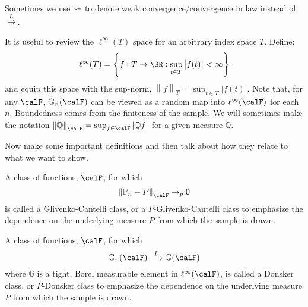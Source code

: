\begin{remark}[Notation]
	Sometimes we use \(\rightsquigarrow\) to denote weak convergence/convergence in law instead of  \(\overset{L}{\to}\).	
\end{remark}

\begin{remark}
    \label{rem:def-recall}
	It is useful to review the \(\ell^\infty(T)\) space for an arbitrary index space  \(T\). Define:
	\begin{equation}
		\label{eq:ell-infty}
		\ell^\infty(T) = \left\{f:T\to\SR: \sup_{t\in T}\left|f(t)\right| <\infty\right\}
	\end{equation}
	and equip this space with the sup-norm, \(\left\|f\right\|_T = \sup_{t\in T}\left|f(t)\right|\). Note that, for any \(\calF\),  \(\mathbb{G}_n(\calF)\) can be viewed as a random map into \(\ell^\infty(\calF)\) for each \(n\). Boundedness comes from the finiteness of the sample. We will sometimes make the notation \(\left\|\mathbb{Q}\right\|_\calF = \sup_{f\in\calF}\left|\mathbb{Q}f\right|\) for a given measure \(\mathbb{Q}\).
\end{remark}

Now make some important definitions and then talk about how they relate to what we want to show. 

\begin{definition}
	\label{def:gc-class}
	A class of functions, \(\calF\), for which
	\begin{equation}
		\label{eq:gc-def}
		\left\|\P_n-P\right\|_\calF \to_p 0
	\end{equation}
	is called a Glivenko-Cantelli class, or a \(P\)-Glivenko-Cantelli class to emphasize the dependence on the underlying measure \(P\) from which the sample is drawn.
\end{definition}

\begin{definition}
	\label{def:donsker-class}
	A class of functions, \(\calF\), for which
	 \begin{equation}
		\label{eq:donsker-def}
		\mathbb{G}_n(\calF) \overset{L}{\longrightarrow} \mathbb{G}(\calF)
	\end{equation}
	where \(\mathbb{G}\) is a tight, Borel measurable element in \(\ell^\infty(\calF)\), is called a Donsker class, or  \(P\)-Donsker class to emphasize the dependence on the underlying measure  \(P\) from which the sample is drawn.
\end{definition}

